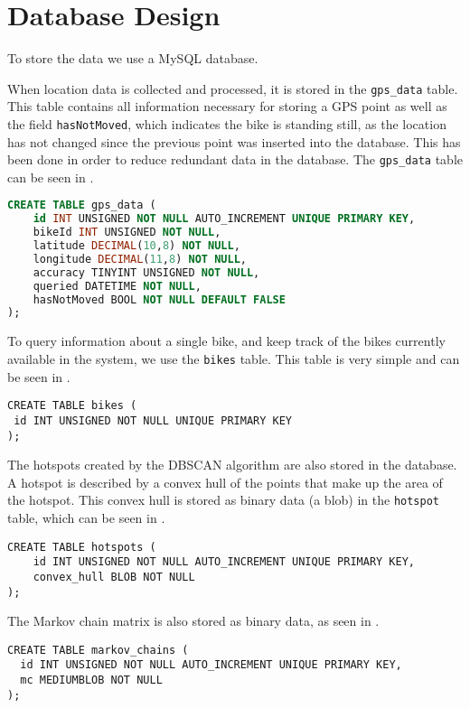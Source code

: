 \chapter{Database Design}\label{database_design}
To store the data we use a MySQL database.

When location data is collected and processed, it is stored in the \texttt{gps\_data} table.
This table contains all information necessary for storing a GPS point as well as the field \texttt{hasNotMoved}, which indicates the bike is standing still, as the location has not changed since the previous point was inserted into the database.
This has been done in order to reduce redundant data in the database.
The \texttt{gps\_data} table can be seen in .

\begin{lstlisting}[caption=Table for GPS\_data, label=tbl_gpsdata, language=SQL]
CREATE TABLE gps_data (
	id INT UNSIGNED NOT NULL AUTO_INCREMENT UNIQUE PRIMARY KEY,
	bikeId INT UNSIGNED NOT NULL,
	latitude DECIMAL(10,8) NOT NULL,
	longitude DECIMAL(11,8) NOT NULL,
	accuracy TINYINT UNSIGNED NOT NULL,
	queried DATETIME NOT NULL,
	hasNotMoved BOOL NOT NULL DEFAULT FALSE
);
\end{lstlisting}

To query information about a single bike, and keep track of the bikes currently available in the system, we use the \texttt{bikes} table.
This table is very simple and can be seen in .

\begin{lstlisting}[caption=Table for bikes, label=tbl_bikes]
CREATE TABLE bikes (
 id INT UNSIGNED NOT NULL UNIQUE PRIMARY KEY
);
\end{lstlisting}

The hotspots created by the DBSCAN algorithm are also stored in the database.
A hotspot is described by a convex hull of the points that make up the area of the hotspot.
This convex hull is stored as binary data (a blob) in the \texttt{hotspot} table, which can be seen in .

\begin{lstlisting}[caption=Table for hotspots, label=tbl_hotspot]
CREATE TABLE hotspots (
	id INT UNSIGNED NOT NULL AUTO_INCREMENT UNIQUE PRIMARY KEY,
	convex_hull BLOB NOT NULL
);
\end{lstlisting}

The Markov chain matrix is also stored as binary data, as seen in .

\begin{lstlisting}[caption=Table for Markov chains, label=tbl_markov]
CREATE TABLE markov_chains (
  id INT UNSIGNED NOT NULL AUTO_INCREMENT UNIQUE PRIMARY KEY,
  mc MEDIUMBLOB NOT NULL
);
\end{lstlisting}
